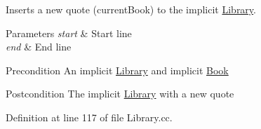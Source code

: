 Inserts a new quote (current\+Book) to the implicit \hyperlink{class_library}{Library}. 


\begin{DoxyParams}{Parameters}
{\em start} & Start line \\
\hline
{\em end} & End line \\
\hline
\end{DoxyParams}
\begin{DoxyPrecond}{Precondition}
An implicit \hyperlink{class_library}{Library} and implicit \hyperlink{class_book}{Book} 
\end{DoxyPrecond}
\begin{DoxyPostcond}{Postcondition}
The implicit \hyperlink{class_library}{Library} with a new quote 
\end{DoxyPostcond}


Definition at line 117 of file Library.\+cc.


